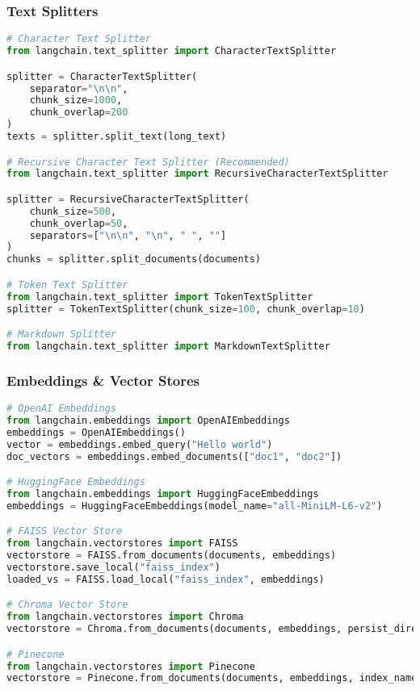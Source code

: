 \begin{frame}[fragile]\frametitle{Text Splitters}
\begin{lstlisting}[language=python,basicstyle=\tiny]
# Character Text Splitter
from langchain.text_splitter import CharacterTextSplitter

splitter = CharacterTextSplitter(
    separator="\n\n",
    chunk_size=1000,
    chunk_overlap=200
)
texts = splitter.split_text(long_text)

# Recursive Character Text Splitter (Recommended)
from langchain.text_splitter import RecursiveCharacterTextSplitter

splitter = RecursiveCharacterTextSplitter(
    chunk_size=500,
    chunk_overlap=50,
    separators=["\n\n", "\n", " ", ""]
)
chunks = splitter.split_documents(documents)

# Token Text Splitter
from langchain.text_splitter import TokenTextSplitter
splitter = TokenTextSplitter(chunk_size=100, chunk_overlap=10)

# Markdown Splitter
from langchain.text_splitter import MarkdownTextSplitter
\end{lstlisting}
\end{frame}

\begin{frame}[fragile]\frametitle{Embeddings \& Vector Stores}
\begin{lstlisting}[language=python,basicstyle=\tiny]
# OpenAI Embeddings
from langchain.embeddings import OpenAIEmbeddings
embeddings = OpenAIEmbeddings()
vector = embeddings.embed_query("Hello world")
doc_vectors = embeddings.embed_documents(["doc1", "doc2"])

# HuggingFace Embeddings
from langchain.embeddings import HuggingFaceEmbeddings
embeddings = HuggingFaceEmbeddings(model_name="all-MiniLM-L6-v2")

# FAISS Vector Store
from langchain.vectorstores import FAISS
vectorstore = FAISS.from_documents(documents, embeddings)
vectorstore.save_local("faiss_index")
loaded_vs = FAISS.load_local("faiss_index", embeddings)

# Chroma Vector Store
from langchain.vectorstores import Chroma
vectorstore = Chroma.from_documents(documents, embeddings, persist_directory="./chroma_db")

# Pinecone
from langchain.vectorstores import Pinecone
vectorstore = Pinecone.from_documents(documents, embeddings, index_name="myindex")
\end{lstlisting}
\end{frame}

